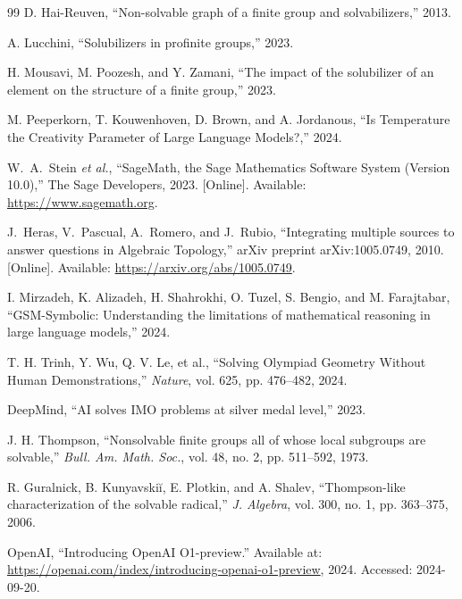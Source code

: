 \documentclass{article}
\begin{document}
\begin{thebibliography}{99}
D. Hai-Reuven, “Non-solvable graph of a finite group and solvabilizers,” 2013.

A. Lucchini, “Solubilizers in profinite groups,” 2023.


H. Mousavi, M. Poozesh, and Y. Zamani, “The impact of the solubilizer of an element on the structure of a finite group,” 2023.

M. Peeperkorn, T. Kouwenhoven, D. Brown, and A. Jordanous, “Is Temperature the Creativity Parameter of Large Language Models?,” 2024.

W.~A.~Stein \emph{et al.}, ``SageMath, the Sage Mathematics Software System (Version 10.0),'' The Sage Developers, 2023. [Online]. Available: \url{https://www.sagemath.org}.

J.~Heras, V.~Pascual, A.~Romero, and J.~Rubio, ``Integrating multiple sources to answer questions in Algebraic Topology,'' arXiv preprint arXiv:1005.0749, 2010. [Online]. Available: \url{https://arxiv.org/abs/1005.0749}.

I. Mirzadeh, K. Alizadeh, H. Shahrokhi, O. Tuzel, S. Bengio, and M. Farajtabar, “GSM-Symbolic: Understanding the limitations of mathematical reasoning in large language models,” 2024.

T. H. Trinh, Y. Wu, Q. V. Le, et al., “Solving Olympiad Geometry Without Human Demonstrations,” \emph{Nature}, vol. 625, pp. 476–482, 2024.

DeepMind, “AI solves IMO problems at silver medal level,” 2023. 

J. H. Thompson, “Nonsolvable finite groups all of whose local subgroups are solvable,” \emph{Bull. Am. Math. Soc.}, vol. 48, no. 2, pp. 511–592, 1973.

R. Guralnick, B. Kunyavskiĭ, E. Plotkin, and A. Shalev, “Thompson-like characterization of the solvable radical,” \emph{J. Algebra}, vol. 300, no. 1, pp. 363–375, 2006.

OpenAI, “Introducing OpenAI O1-preview.” Available at: \url{https://openai.com/index/introducing-openai-o1-preview}, 2024. Accessed: 2024-09-20.

\end{thebibliography}
\end{document}
